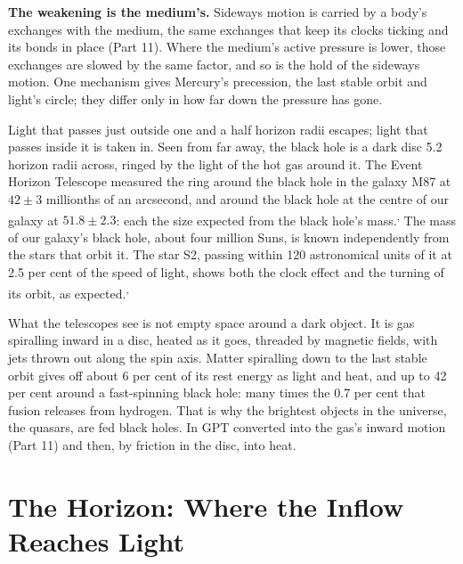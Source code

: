 \begin{hypbar}
\textbf{The weakening is the medium's.} Sideways motion is carried by a body's exchanges with the medium, the same exchanges that keep its clocks ticking and its bonds in place (Part 11).\footnotemark{} Where the medium's active pressure is lower, those exchanges are slowed by the same factor, and so is the hold of the sideways motion. One mechanism gives Mercury's precession, the last stable orbit and light's circle; they differ only in how far down the pressure has gone.
\end{hypbar}

 Light that passes just outside one and a half horizon radii escapes; light that passes inside it is taken in. Seen from far away, the black hole is a dark disc 5.2 horizon radii across, ringed by the light of the hot gas around it. The Event Horizon Telescope measured the ring around the black hole in the galaxy M87 at $42\pm3$ millionths of an arcsecond, and around the black hole at the centre of our galaxy at $51.8\pm2.3$: each the size expected from the black hole's mass.\textsuperscript{,} The mass of our galaxy's black hole, about four million Suns, is known independently from the stars that orbit it. The star S2, passing within 120 astronomical units of it at 2.5 per cent of the speed of light, shows both the clock effect and the turning of its orbit, as expected.\textsuperscript{,}

 What the telescopes see is not empty space around a dark object. It is gas spiralling inward in a disc, heated as it goes, threaded by magnetic fields, with jets thrown out along the spin axis. Matter spiralling down to the last stable orbit gives off about 6 per cent of its rest energy as light and heat, and up to 42 per cent around a fast-spinning black hole: many times the 0.7 per cent that fusion releases from hydrogen. That is why the brightest objects in the universe, the quasars, are fed black holes. In GPT  converted into the gas's inward motion (Part 11) and then, by friction in the disc, into heat.

\section{The Horizon: Where the Inflow Reaches Light}

